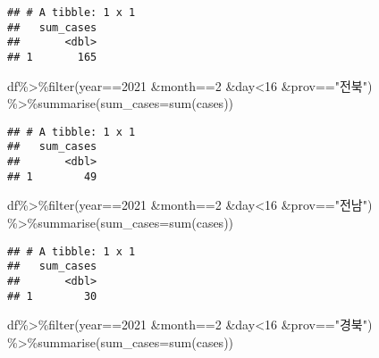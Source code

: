 \documentclass[
]{article}
\newenvironment{Shaded}{\begin{snugshade}}{\end{snugshade}}
\newcommand{\AttributeTok}[1]{\textcolor[rgb]{0.77,0.63,0.00}{#1}}
\newcommand{\DecValTok}[1]{\textcolor[rgb]{0.00,0.00,0.81}{#1}}
\newcommand{\FunctionTok}[1]{\textcolor[rgb]{0.00,0.00,0.00}{#1}}
\newcommand{\NormalTok}[1]{#1}
\newcommand{\SpecialCharTok}[1]{\textcolor[rgb]{0.00,0.00,0.00}{#1}}
\newcommand{\StringTok}[1]{\textcolor[rgb]{0.31,0.60,0.02}{#1}}
\begin{document}
\begin{verbatim}
## # A tibble: 1 x 1
##   sum_cases
##       <dbl>
## 1       165
\end{verbatim}

\begin{Shaded}
\begin{Highlighting}[]
\NormalTok{df}\SpecialCharTok{\%\textgreater{}\%}\FunctionTok{filter}\NormalTok{(year}\SpecialCharTok{==}\DecValTok{2021} \SpecialCharTok{\&}\NormalTok{month}\SpecialCharTok{==}\DecValTok{2} \SpecialCharTok{\&}\NormalTok{day}\SpecialCharTok{\textless{}}\DecValTok{16} \SpecialCharTok{\&}\NormalTok{prov}\SpecialCharTok{==}\StringTok{"전북"}\NormalTok{) }\SpecialCharTok{\%\textgreater{}\%}\FunctionTok{summarise}\NormalTok{(}\AttributeTok{sum\_cases=}\FunctionTok{sum}\NormalTok{(cases))}
\end{Highlighting}
\end{Shaded}

\begin{verbatim}
## # A tibble: 1 x 1
##   sum_cases
##       <dbl>
## 1        49
\end{verbatim}

\begin{Shaded}
\begin{Highlighting}[]
\NormalTok{df}\SpecialCharTok{\%\textgreater{}\%}\FunctionTok{filter}\NormalTok{(year}\SpecialCharTok{==}\DecValTok{2021} \SpecialCharTok{\&}\NormalTok{month}\SpecialCharTok{==}\DecValTok{2} \SpecialCharTok{\&}\NormalTok{day}\SpecialCharTok{\textless{}}\DecValTok{16} \SpecialCharTok{\&}\NormalTok{prov}\SpecialCharTok{==}\StringTok{"전남"}\NormalTok{) }\SpecialCharTok{\%\textgreater{}\%}\FunctionTok{summarise}\NormalTok{(}\AttributeTok{sum\_cases=}\FunctionTok{sum}\NormalTok{(cases))}
\end{Highlighting}
\end{Shaded}

\begin{verbatim}
## # A tibble: 1 x 1
##   sum_cases
##       <dbl>
## 1        30
\end{verbatim}

\begin{Shaded}
\begin{Highlighting}[]
\NormalTok{df}\SpecialCharTok{\%\textgreater{}\%}\FunctionTok{filter}\NormalTok{(year}\SpecialCharTok{==}\DecValTok{2021} \SpecialCharTok{\&}\NormalTok{month}\SpecialCharTok{==}\DecValTok{2} \SpecialCharTok{\&}\NormalTok{day}\SpecialCharTok{\textless{}}\DecValTok{16} \SpecialCharTok{\&}\NormalTok{prov}\SpecialCharTok{==}\StringTok{"경북"}\NormalTok{) }\SpecialCharTok{\%\textgreater{}\%}\FunctionTok{summarise}\NormalTok{(}\AttributeTok{sum\_cases=}\FunctionTok{sum}\NormalTok{(cases))}
\end{Highlighting}
\end{Shaded}
\end{document}
